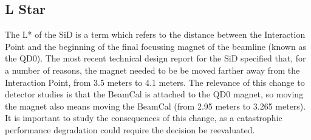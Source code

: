 \documentclass{report}
\begin{document}
            \subsection{L Star}

                The L* of the SiD is a term which refers to the distance between the Interaction Point and the beginning of the final focussing magnet of the beamline (known as the QD0). The most recent technical design report for the SiD specified that, for a number of reasons, the magnet needed to be be moved farther away from the Interaction Point, from 3.5 meters to 4.1 meters. The relevance of this change to detector studies is that the BeamCal is attached to the QD0 magnet, so moving the magnet also means moving the BeamCal (from 2.95 meters to 3.265 meters). It is important to study the consequences of this change, as a catastrophic performance degradation could require the decision be reevaluated.
                

\end{document}
